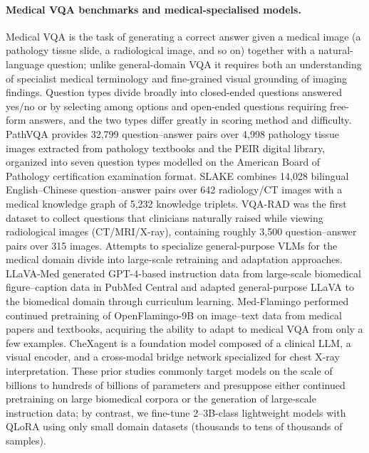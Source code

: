 \paragraph{Medical VQA benchmarks and medical-specialised models.}
Medical VQA is the task of generating a correct answer given a medical image (a
pathology tissue slide, a radiological image, and so on) together with a
natural-language question; unlike general-domain VQA it requires both an
understanding of specialist medical terminology and fine-grained visual grounding
of imaging findings. Question types divide broadly into closed-ended questions
answered yes/no or by selecting among options and open-ended questions requiring
free-form answers, and the two types differ greatly in scoring method and
difficulty. PathVQA \citep{he2020pathvqa} provides 32,799 question--answer pairs
over 4,998 pathology tissue images extracted from pathology textbooks and the
PEIR digital library, organized into seven question types modelled on the
American Board of Pathology certification examination format. SLAKE
\citep{liu2021slake} combines 14,028 bilingual English--Chinese question--answer
pairs over 642 radiology/CT images with a medical knowledge graph of 5,232
knowledge triplets. VQA-RAD \citep{lau2018vqarad} was the first dataset to
collect questions that clinicians naturally raised while viewing radiological
images (CT/MRI/X-ray), containing roughly 3,500 question--answer pairs over 315
images. Attempts to specialize general-purpose VLMs for the medical domain divide
into large-scale retraining and adaptation approaches. LLaVA-Med
\citep{li2023llavamed} generated GPT-4-based instruction data from large-scale
biomedical figure--caption data in PubMed Central and adapted general-purpose
LLaVA to the biomedical domain through curriculum learning. Med-Flamingo
\citep{moor2023medflamingo} performed continued pretraining of OpenFlamingo-9B on
image--text data from medical papers and textbooks, acquiring the ability to
adapt to medical VQA from only a few examples. CheXagent
\citep{chen2024chexagent} is a foundation model composed of a clinical LLM, a
visual encoder, and a cross-modal bridge network specialized for chest X-ray
interpretation. These prior studies commonly target models on the scale of
billions to hundreds of billions of parameters and presuppose either continued
pretraining on large biomedical corpora or the generation of large-scale
instruction data; by contrast, we fine-tune 2--3B-class lightweight models with
QLoRA using only small domain datasets (thousands to tens of thousands of
samples).


